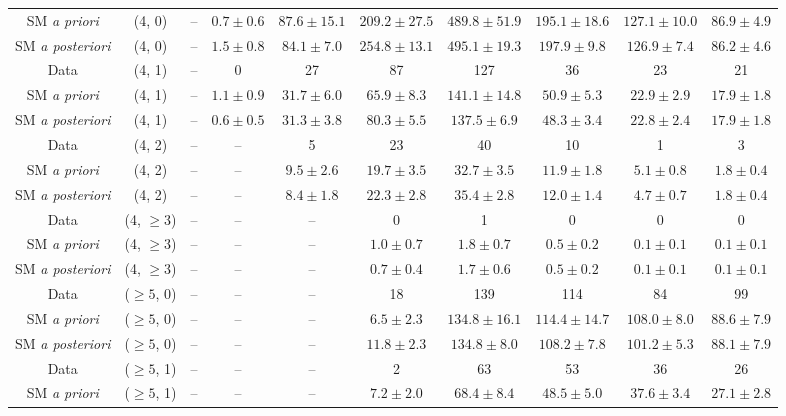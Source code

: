 \begin{table}[h!]
{\begin{tabular}{cccccccccc}
	SM \textit{a priori} & (4, 0) & -- & $0.7\pm 0.6$ & $87.6\pm 15.1$ & $209.2\pm 27.5$ & $489.8\pm 51.9$ & $195.1\pm 18.6$ & $127.1\pm 10.0$ & $86.9\pm 4.9$ \\[0.5ex] 
	SM \textit{a posteriori} & (4, 0) & -- & $1.5\pm 0.8$ & $84.1\pm 7.0$ & $254.8\pm 13.1$ & $495.1\pm 19.3$ & $197.9\pm 9.8$ & $126.9\pm 7.4$ & $86.2\pm 4.6$ \\[0.5ex] 
	Data & (4, 1) & -- & 0 & 27 & 87 & 127 & 36 & 23 & 21 \\[0.5ex] 
	SM \textit{a priori} & (4, 1) & -- & $1.1\pm 0.9$ & $31.7\pm 6.0$ & $65.9\pm 8.3$ & $141.1\pm 14.8$ & $50.9\pm 5.3$ & $22.9\pm 2.9$ & $17.9\pm 1.8$ \\[0.5ex] 
	SM \textit{a posteriori} & (4, 1) & -- & $0.6\pm 0.5$ & $31.3\pm 3.8$ & $80.3\pm 5.5$ & $137.5\pm 6.9$ & $48.3\pm 3.4$ & $22.8\pm 2.4$ & $17.9\pm 1.8$ \\[0.5ex] 
	Data & (4, 2) & -- & -- & 5 & 23 & 40 & 10 & 1 & 3 \\[0.5ex] 
	SM \textit{a priori} & (4, 2) & -- & -- & $9.5\pm 2.6$ & $19.7\pm 3.5$ & $32.7\pm 3.5$ & $11.9\pm 1.8$ & $5.1\pm 0.8$ & $1.8\pm 0.4$ \\[0.5ex] 
	SM \textit{a posteriori} & (4, 2) & -- & -- & $8.4\pm 1.8$ & $22.3\pm 2.8$ & $35.4\pm 2.8$ & $12.0\pm 1.4$ & $4.7\pm 0.7$ & $1.8\pm 0.4$ \\[0.5ex] 
	Data & (4, $\ge3$) & -- & -- & -- & 0 & 1 & 0 & 0 & 0 \\[0.5ex] 
	SM \textit{a priori} & (4, $\ge3$) & -- & -- & -- & $1.0\pm 0.7$ & $1.8\pm 0.7$ & $0.5\pm 0.2$ & $0.1\pm 0.1$ & $0.1\pm 0.1$ \\[0.5ex] 
	SM \textit{a posteriori} & (4, $\ge3$) & -- & -- & -- & $0.7\pm 0.4$ & $1.7\pm 0.6$ & $0.5\pm 0.2$ & $0.1\pm 0.1$ & $0.1\pm 0.1$ \\[0.5ex] 
	Data & ($\ge5$, 0) & -- & -- & -- & 18 & 139 & 114 & 84 & 99 \\[0.5ex] 
	SM \textit{a priori} & ($\ge5$, 0) & -- & -- & -- & $6.5\pm 2.3$ & $134.8\pm 16.1$ & $114.4\pm 14.7$ & $108.0\pm 8.0$ & $88.6\pm 7.9$ \\[0.5ex] 
	SM \textit{a posteriori} & ($\ge5$, 0) & -- & -- & -- & $11.8\pm 2.3$ & $134.8\pm 8.0$ & $108.2\pm 7.8$ & $101.2\pm 5.3$ & $88.1\pm 7.9$ \\[0.5ex] 
	Data & ($\ge5$, 1) & -- & -- & -- & 2 & 63 & 53 & 36 & 26 \\[0.5ex] 
	SM \textit{a priori} & ($\ge5$, 1) & -- & -- & -- & $7.2\pm 2.0$ & $68.4\pm 8.4$ & $48.5\pm 5.0$ & $37.6\pm 3.4$ & $27.1\pm 2.8$ \\[0.5ex] 

\end{tabular}}
\end{table}

